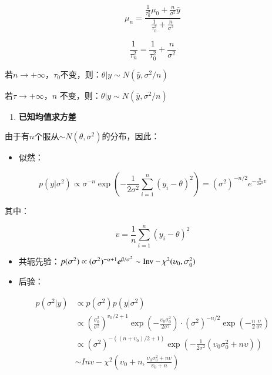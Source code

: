 \[\mu_{n}=\frac{\frac{1}{\tau_{0}^{2}} \mu_{0}+\frac{n}{\sigma^{2}} \bar{y}}{\frac{1}{\tau_{0}^{2}}+\frac{n}{\sigma^{2}}}\]

\[\frac{1}{\tau_{n}^{2}}=\frac{1}{\tau_{0}^{2}}+\frac{n}{\sigma^{2}}\]

若\(n\rightarrow+\infty\)，\(\tau_0\)不变，则：\(\theta|y\sim N(\bar{y},\sigma^2/n)\)

若\(\tau\rightarrow+\infty\)，\(n\)
不变，则：\(\theta|y\sim N(\bar{y},\sigma^2/n)\)

\begin{enumerate}
\def\labelenumi{\arabic{enumi}.}
\item
  \textbf{已知均值求方差}
\end{enumerate}

由于有\(n\)个服从\(\sim N(\theta,\sigma^2)\)的分布，因此：

\begin{itemize}
\item
  似然：
\end{itemize}

\[p(y|\sigma^2)\propto\sigma^{-n}\exp\left(-
\frac{1}{2\sigma^2}\sum_{i=1}^{n}(y_i-\theta)^2
\right)=(\sigma^2)^{-n/2}e^{-\frac{n}{2\sigma^2}v}\]

其中：

\[v=\frac{1}{n}\sum_{i=1}^n(y_i-\theta)^2\]

\begin{itemize}
\item
  共轭先验：\(p(\sigma^2)\propto(\sigma^2)^{-\alpha+1}e^{\beta/\sigma^2} \sim \rm Inv-\chi^2(\upsilon_0,\sigma^2_0)\)
\item
  后验：
\end{itemize}

\begin{equation}
    \begin{aligned}
        p(\sigma^2|y)&\propto p(\sigma^2)p(y|\sigma^2)\\
        &\propto \left( \frac{\sigma^2_0}{\sigma^2} \right)^{v_0/2+1}
        \exp\left( -\frac{\upsilon_0\sigma^2_0}{2\sigma^2} \right)\cdot
        (\sigma^2)^{-n/2}\exp\left(-\frac{n}{2}\frac{\upsilon}{\sigma^2}\right)\\
        &\propto (\sigma^2)^{-((n+\upsilon_0)/2+1)}\exp\left(
        -\frac{1}{2\sigma^2}(\upsilon_0\sigma_0^2+n\upsilon)
        \right)\\
        &\sim Inv-\chi^2(\upsilon_0+n,\frac{\upsilon_0\sigma_0^2+n\upsilon}{\upsilon_0+n})
        \end{aligned}
\end{equation}
